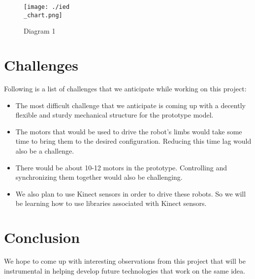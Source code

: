\documentclass[11pt]{article}
\begin{document}
\begin{figure}
  \texttt{[image: ./ied\\\_chart.png]}
  \caption{Diagram 1}
  \label{fig:dig1}
\end{figure}
\section{\textbf{Challenges}}
\label{sec-6}

Following is a list of challenges that we anticipate while working on this project:


\begin{itemize}
\item The most difficult challenge that we anticipate is coming up with a decently flexible and sturdy mechanical structure for the prototype model.
\item The motors that would be used to drive the robot’s  limbs would take some time to bring them to the desired configuration. Reducing this time lag would also be a challenge.
\item There would be about 10-12 motors in the prototype. Controlling and synchronizing them together would also be challenging.
\item We also plan to use Kinect sensors in order to drive these robots. So we will be learning how to use libraries associated with Kinect sensors.
\end{itemize}
\section{\textbf{Conclusion}}
\label{sec-7}


We hope to come up with interesting observations from this project that will be instrumental in helping develop future technologies that work on the same idea.
\end{document}
